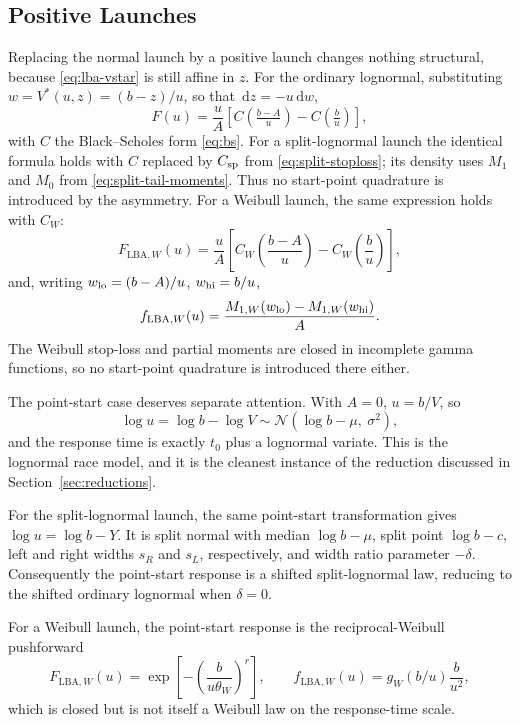 \documentclass[12pt]{article}
\newcommand{\dd}{\,\mathrm{d}}
\newcommand{\Normal}{\mathcal{N}}
\theoremstyle{remark}
\begin{document}
\subsection{Positive Launches}
Replacing the normal launch by a positive launch changes nothing structural, because \eqref{eq:lba-vstar} is still affine in $z$. For the ordinary lognormal, substituting $w = V^{*}(u,z) = (b-z)/u$, so that $\dd z = -u \dd w$,
\begin{equation}
  F(u) = \frac{u}{A}\left[C\!\left(\tfrac{b-A}{u}\right) - C\!\left(\tfrac{b}{u}\right)\right],
\end{equation}
with $C$ the Black--Scholes form \eqref{eq:bs}. For a split-lognormal launch the identical formula holds with $C$ replaced by $C_{\rm sp}$ from
\eqref{eq:split-stoploss}; its density uses $M_1$ and $M_0$ from
\eqref{eq:split-tail-moments}. Thus no start-point quadrature is introduced by
the asymmetry. For a Weibull launch, the same expression holds with $C_W$:
\begin{equation}
  F_{\mathrm{LBA},W}(u)
   = \frac{u}{A}\left[C_W\!\left(\frac{b-A}{u}\right)-C_W\!\left(\frac{b}{u}\right)\right],
\end{equation}
and, writing $w_{\rm lo}=(b-A)/u$, $w_{\rm hi}=b/u$,
\begin{equation}
  f_{\mathrm{LBA},W}(u)
   = \frac{M_{1,W}(w_{\rm lo})-M_{1,W}(w_{\rm hi})}{A}.
\end{equation}
The Weibull stop-loss and partial moments are closed in incomplete gamma functions, so no start-point quadrature is introduced there either.

The point-start case deserves separate attention. With $A = 0$, $u = b/V$, so
\begin{equation}
  \log u = \log b - \log V \sim \Normal\!\left(\log b - \mu,\ \sigma^2\right),
\end{equation}
and the response time is exactly $t_0$ plus a lognormal variate. This is the lognormal race model, and it is the cleanest instance of the reduction discussed in Section~\ref{sec:reductions}.

For the split-lognormal launch, the same point-start transformation gives $\log u=\log b-Y$. It is split normal with median $\log b-\mu$, split point $\log b-c$, left and right widths $s_R$ and $s_L$, respectively, and width ratio parameter $-\delta$. Consequently the point-start response is a shifted split-lognormal law, reducing to the shifted ordinary lognormal when $\delta=0$.

For a Weibull launch, the point-start response is the reciprocal-Weibull pushforward
\begin{equation}
  F_{\mathrm{LBA},W}(u)=\exp\!\left[-\left(\frac{b}{u\theta_W}\right)^r\right],
  \qquad
  f_{\mathrm{LBA},W}(u)=g_W(b/u)\frac{b}{u^2},
\end{equation}
which is closed but is not itself a Weibull law on the response-time scale.
\end{document}
